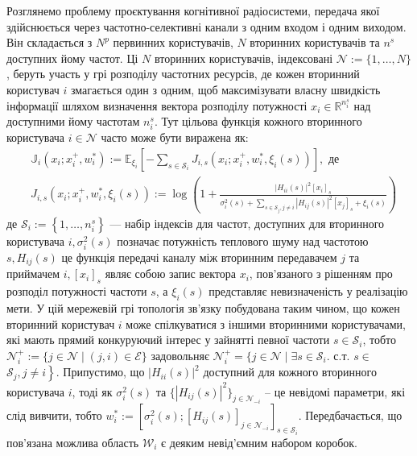 \documentclass[a4paper]{article}
\begin{document}
Розглянемо проблему проєктування когнітивної радіосистеми, передача якої здійснюється через частотно-селективні канали з одним входом і одним виходом. Він складається з $N^{p}$ первинних користувачів, $N$ вторинних користувачів та $n^{s}$ доступних йому частот. Ці $N$ вторинних користувачів, індексовані $\mathcal{N} := \{1, \ldots, N\}$, беруть участь у грі розподілу частотних ресурсів, де кожен вторинний користувач $i$ змагається один з одним, щоб максимізувати власну швидкість інформації шляхом визначення вектора розподілу потужності $x_{i} \in \mathbb{R}^{n_{i}^{s}}$ над доступними йому частотам $n_{i}^{s}$. Тут цільова функція кожного вторинного користувача $i \in \mathcal{N}$ часто може бути виражена як:
\begin{equation}
    \begin{align}
&\mathbb{J}_{i}(x_{i}; x_{i}^{+}, w_{i}^{*}) := \mathbb{E}_{\xi_{ i}}[-\sum_{s \in \mathcal{S}_{i}} J_{i, s}(x_{i}; x_{i}^{+}, w_{i} ^{*}, \xi_{i}(s))], \text { де } \\
&J_{i, s}(x_{i}; x_{i}^{+}, w_{i}^{*}, \xi_{i}(s)):=\log ( 1+\frac{|H_{i i}(s)|^{2}[x_{i}]_{s}}{\sigma_{i}^{2}(s) +\sum_{s \in \mathcal{S}_{j}, j \neq i}|H_{i j}(s)|^{2}[x_{j}]_ {s}+\xi_{i}(s)})
\end{align}
\end{equation}
де $\mathcal{S}_{i}:=\left\{1, \ldots, n_{i}^{s}\right\}$ — набір індексів для частот, доступних для вторинного користувача $i, \sigma_ {i}^{2}(s)$ позначає потужність теплового шуму над частотою $s, H_{i j}(s)$ це функція передачі каналу між вторинним передавачем $j$ та приймачем $i,\left [x_{i}\right]_{s}$ являє собою запис вектора $x_{i}$, пов'язаного з рішенням про розподіл потужності частоти $s$, а $\xi_{i}(s)$ представляє невизначеність у реалізацію мети. У цій мережевій грі топологія зв'язку побудована таким чином, що кожен вторинний користувач $i$ може спілкуватися з іншими вторинними користувачами, які мають прямий конкуруючий інтерес у зайнятті певної частоти $s \in \mathcal{S}_{i}$, тобто $\mathcal{N}_{i}^{+}:=\{j \in \mathcal{N} \mid(j, i ) \in \mathcal{E}\}$ задовольняє $\mathcal{N}_{i}^{+}=\{j \in \mathcal{N} \mid \exists s \in \mathcal{S }_{i}.$ с.т. $s \in$ $\left.\mathcal{S}_{j}, j \neq i\right\}$. Припустимо, що $\left|H_{i i}(s)\right|^{2}$ доступний для кожного вторинного користувача $i$, тоді як $\sigma_{i}^{2}(s)$ та $\{|H_{i j}(s)|^{2}\}_{j \in \mathcal{N}_{-i}}$ – це невідомі параметри, які слід вивчити, тобто $ w_{i}^{*}:=[\sigma_{i}^{2}(s) ;\left[H_{i j}(s)\right]_{j \in \mathcal{N}_ {-i}}]_{s \in \mathcal{S}_{i}}$. Передбачається, що пов’язана можлива область $\mathcal{W}_{i}$ є деяким невід’ємним набором коробок.
\end{document}
